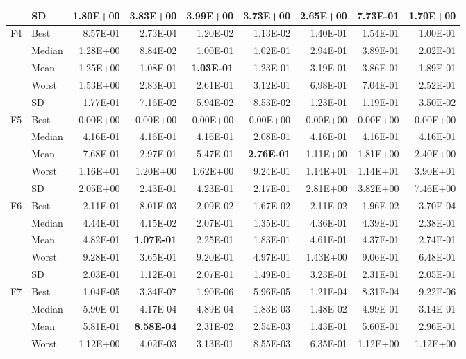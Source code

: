 \documentclass[algorithms,article,submit,moreauthors,pdftex]{Definitions/mdpi}
\newcommand{\bestval}[1]{\textbf{#1}}
\begin{document}
\begin{table}[p]
{\begin{tabular}{llrrrrrrr}
 & SD & 1.80E+00 & 3.83E+00 & 3.99E+00 & 3.73E+00 & 2.65E+00 & 7.73E-01 & 1.70E+00 \\
\midrule
F4 & Best & 8.57E-01 & 2.73E-04 & 1.20E-02 & 1.13E-02 & 1.40E-01 & 1.54E-01 & 1.00E-01 \\
 & Median & 1.28E+00 & 8.84E-02 & 1.00E-01 & 1.02E-01 & 2.94E-01 & 3.89E-01 & 2.02E-01 \\
 & Mean & 1.25E+00 & 1.08E-01 & \bestval{1.03E-01} & 1.23E-01 & 3.19E-01 & 3.86E-01 & 1.89E-01 \\
 & Worst & 1.53E+00 & 2.83E-01 & 2.61E-01 & 3.12E-01 & 6.98E-01 & 7.04E-01 & 2.52E-01 \\
 & SD & 1.77E-01 & 7.16E-02 & 5.94E-02 & 8.53E-02 & 1.23E-01 & 1.19E-01 & 3.50E-02 \\
\midrule
F5 & Best & 0.00E+00 & 0.00E+00 & 0.00E+00 & 0.00E+00 & 0.00E+00 & 0.00E+00 & 0.00E+00 \\
 & Median & 4.16E-01 & 4.16E-01 & 4.16E-01 & 2.08E-01 & 4.16E-01 & 4.16E-01 & 4.16E-01 \\
 & Mean & 7.68E-01 & 2.97E-01 & 5.47E-01 & \bestval{2.76E-01} & 1.11E+00 & 1.81E+00 & 2.40E+00 \\
 & Worst & 1.16E+01 & 1.20E+00 & 1.62E+00 & 9.24E-01 & 1.14E+01 & 1.14E+01 & 3.90E+01 \\
 & SD & 2.05E+00 & 2.43E-01 & 4.23E-01 & 2.17E-01 & 2.81E+00 & 3.82E+00 & 7.46E+00 \\
\midrule
F6 & Best & 2.11E-01 & 8.01E-03 & 2.09E-02 & 1.67E-02 & 2.11E-02 & 1.96E-02 & 3.70E-04 \\
 & Median & 4.44E-01 & 4.15E-02 & 2.07E-01 & 1.35E-01 & 4.36E-01 & 4.39E-01 & 2.38E-01 \\
 & Mean & 4.82E-01 & \bestval{1.07E-01} & 2.25E-01 & 1.83E-01 & 4.61E-01 & 4.37E-01 & 2.74E-01 \\
 & Worst & 9.28E-01 & 3.65E-01 & 9.20E-01 & 4.97E-01 & 1.43E+00 & 9.06E-01 & 6.48E-01 \\
 & SD & 2.03E-01 & 1.12E-01 & 2.07E-01 & 1.49E-01 & 3.23E-01 & 2.31E-01 & 2.05E-01 \\
\midrule
F7 & Best & 1.04E-05 & 3.34E-07 & 1.90E-06 & 5.96E-05 & 1.21E-04 & 8.31E-04 & 9.22E-06 \\
 & Median & 5.90E-01 & 4.17E-04 & 4.89E-04 & 1.83E-03 & 1.48E-02 & 4.99E-01 & 3.14E-01 \\
 & Mean & 5.81E-01 & \bestval{8.58E-04} & 2.31E-02 & 2.54E-03 & 1.43E-01 & 5.60E-01 & 2.96E-01 \\
 & Worst & 1.12E+00 & 4.02E-03 & 3.13E-01 & 8.55E-03 & 6.35E-01 & 1.12E+00 & 1.12E+00 \\

\end{tabular}}
\end{table}
\end{document}
